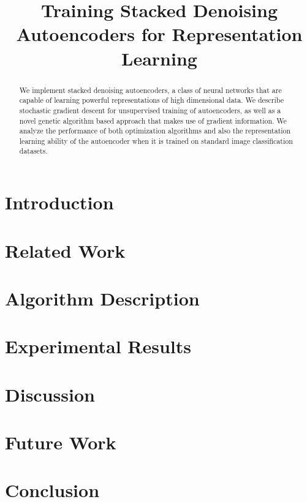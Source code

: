 \documentclass[conference,onecolumn]{IEEEtran}
\begin{document}
\title{Training Stacked Denoising Autoencoders for Representation Learning}

\author{
\and
{}
}

\maketitle

\begin{abstract}
We implement stacked denoising autoencoders, a class of neural networks that are capable of learning powerful representations of high dimensional data. We describe stochastic gradient descent for unsupervised training of autoencoders, as well as a novel genetic algorithm based approach that makes use of gradient information. We analyze the performance of both optimization algorithms and also the representation learning ability of the autoencoder when it is trained on standard image classification datasets. 
\end{abstract}

\FloatBarrier
\section{Introduction}

\FloatBarrier
\section{Related Work}

\FloatBarrier
\section{Algorithm Description}

\FloatBarrier

\section{Experimental Results}

\section{Discussion}
% 

\section{Future Work}

\section{Conclusion}

\FloatBarrier



\end{document}
